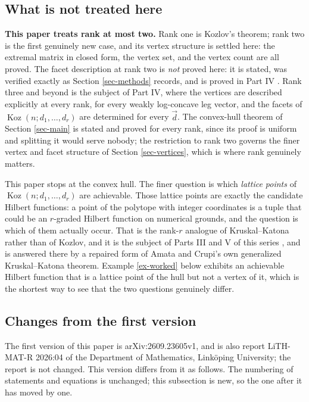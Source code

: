 \documentclass[11pt, a4paper, abstract=yes]{scrartcl}
\theoremstyle{definition}
\theoremstyle{remark}
\theoremstyle{plain}
\newcommand{\Koz}{\operatorname{Koz}}
\let\autocite\cite
\begin{document}
\subsection{What is not treated here}
\label{sec-scope}
\textbf{This paper treats rank at most two.} Rank one is Kozlov's theorem; rank two is the first genuinely
new case, and its vertex structure is settled here: the extremal matrix in closed form, the vertex
set, and the vertex count are all proved. The facet description at rank two is \emph{not} proved here:
it is stated, was verified exactly as Section \ref{sec-methods} records, and is proved in Part IV
\autocite{SnellmanArticle4}. Rank three and beyond is the subject of Part IV, where the vertices are
described explicitly at every rank, for every weakly log-concave leg vector, and the facets of
\(\Koz(n;d_1,\dots,d_r)\) are determined for every \(\vec d\). The convex-hull
theorem of Section \ref{sec-main} is stated and proved for every rank, since its proof is uniform and
splitting it would serve nobody; the restriction to rank two governs the finer vertex and facet
structure of Section \ref{sec-vertices}, which is where rank genuinely matters.


This paper stops at the convex hull. The finer question is which \emph{lattice points} of
\(\Koz(n;d_1,\dots,d_r)\) are achievable. Those lattice points are exactly the candidate Hilbert
functions: a point of the polytope with integer coordinates is a tuple that could be an
\(r\)-graded Hilbert function on numerical grounds, and the question is which of them actually
occur. That is the rank-\(r\) analogue of Kruskal--Katona rather than of Kozlov, and it is the
subject of Parts III and V of this series \autocite{SnellmanArticle3,SnellmanArticle5}, and is
answered there by a repaired form of Amata and Crupi's own generalized Kruskal--Katona theorem. Example \ref{ex-worked} below exhibits an achievable
Hilbert function that is a lattice point of the hull but not a vertex of it, which is the shortest
way to see that the two questions genuinely differ.
\subsection{Changes from the first version}
\label{sec-changes}
The first version of this paper is arXiv:2609.23605v1, and is also report LiTH-MAT-R 2026:04 of the
Department of Mathematics, Linköping University; the report is not changed. This version differs
from it as follows. The numbering of statements and equations is unchanged; this subsection is
new, so the one after it has moved by one.
\end{document}
